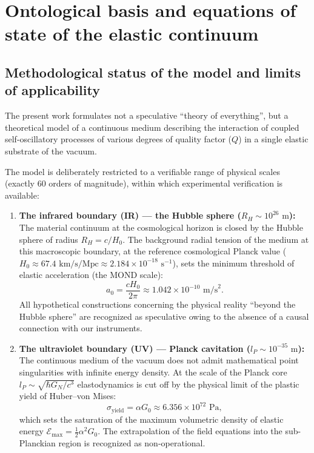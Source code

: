 \documentclass[11pt,a4paper]{article}
\theoremstyle{definition}
\theoremstyle{remark}
\begin{document}
\section{Ontological basis and equations of state of the elastic continuum}
	
\subsection{Methodological status of the model and limits of applicability}

The present work formulates not a speculative ``theory of everything'', but a theoretical model of a continuous medium describing the interaction of coupled self-oscillatory processes of various degrees of quality factor ($Q$) in a single elastic substrate of the vacuum.

The model is deliberately restricted to a verifiable range of physical scales (exactly 60 orders of magnitude), within which experimental verification is available:

\begin{enumerate}
\item \textbf{The infrared boundary (IR) --- the Hubble sphere ($R_H \sim 10^{26}\text{ m}$):}
The material continuum at the cosmological horizon is closed by the Hubble sphere of radius $R_H = c / H_0$. The background radial tension of the medium at this macroscopic boundary, at the reference cosmological Planck value ($H_0 \approx 67.4\text{ km/s/Mpc} \approx 2.184 \times 10^{-18}\text{ s}^{-1}$), sets the minimum threshold of elastic acceleration (the MOND scale):
\begin{equation}
a_0 = \frac{c H_0}{2\pi} \approx 1.042 \times 10^{-10}\text{ m/s}^2.
\label{eq:mond_acceleration_exact}
\end{equation}
All hypothetical constructions concerning the physical reality ``beyond the Hubble sphere'' are recognized as speculative owing to the absence of a causal connection with our instruments.

\item \textbf{The ultraviolet boundary (UV) --- Planck cavitation ($l_P \sim 10^{-35}\text{ m}$):}
The continuous medium of the vacuum does not admit mathematical point singularities with infinite energy density. At the scale of the Planck core $l_P \sim \sqrt{\hbar G_N / c^3}$ elastodynamics is cut off by the physical limit of the plastic yield of Huber--von Mises:
\begin{equation}
\sigma_{\mathrm{yield}} = \alpha G_0 \approx 6.356 \times 10^{72}\text{ Pa},
\label{eq:mises_yield_cutoff}
\end{equation}
which sets the saturation of the maximum volumetric density of elastic energy $\mathcal{E}_{\mathrm{max}} = \frac{1}{2}\alpha^2 G_0$. The extrapolation of the field equations into the sub-Planckian region is recognized as non-operational.
\end{enumerate}
\end{document}
